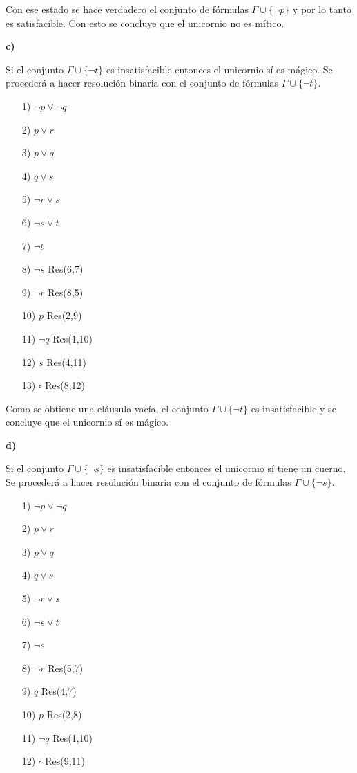 \documentclass{article}
\begin{document}
Con ese estado se hace verdadero el conjunto de fórmulas $\Gamma \cup \{\lnot p\}$ y por lo tanto es satisfacible. Con esto se concluye que el unicornio no es mítico.

\textbf{c)}

Si el conjunto $\Gamma \cup \{\lnot t\}$ es insatisfacible entonces el unicornio sí es mágico. Se procederá a hacer resolución binaria con el conjunto de fórmulas $\Gamma \cup \{\lnot t\}$.

\begin{itemize}
\item[1)] $\lnot p \lor \lnot q$
\item[2)] $p \lor r$
\item[3)] $p \lor q$
\item[4)] $q \lor s$
\item[5)] $\lnot r \lor s$
\item[6)] $\lnot s \lor t$
\item[7)] $\lnot t$
\item[8)] $\lnot s$ Res(6,7)
\item[9)] $\lnot r$ Res(8,5)
\item[10)] $p$ Res(2,9)
\item[11)] $\lnot q$ Res(1,10)
\item[12)] $s$ Res(4,11)
\item[13)] $\square$ Res(8,12)
\end{itemize}

Como se obtiene una cláusula vacía, el conjunto $\Gamma \cup \{\lnot t\}$ es insatisfacible y se concluye que el unicornio sí es mágico.

\textbf{d)}

Si el conjunto $\Gamma \cup \{\lnot s\}$ es insatisfacible entonces el unicornio sí tiene un cuerno. Se procederá a hacer resolución binaria con el conjunto de fórmulas $\Gamma \cup \{\lnot s\}$.

\begin{itemize}
\item[1)] $\lnot p \lor \lnot q$
\item[2)] $p \lor r$
\item[3)] $p \lor q$
\item[4)] $q \lor s$
\item[5)] $\lnot r \lor s$
\item[6)] $\lnot s \lor t$
\item[7)] $\lnot s$
\item[8)] $\lnot r$ Res(5,7)
\item[9)] $q$ Res(4,7)
\item[10)] $p$ Res(2,8)
\item[11)] $\lnot q$ Res(1,10)
\item[12)] $\square$ Res(9,11)
\end{itemize}
\end{document}

